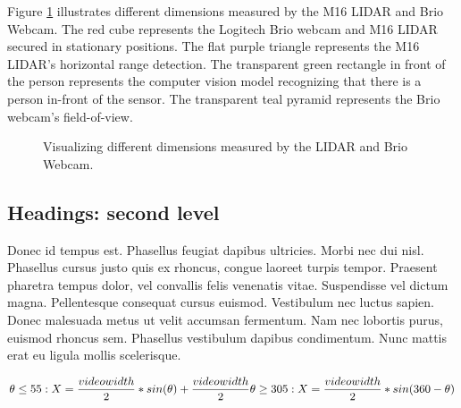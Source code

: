 \documentclass{article}
\begin{document}
		Figure \ref{fig:fig1}  illustrates different dimensions measured by the M16 LIDAR and Brio Webcam.
		The red cube represents the Logitech Brio webcam and M16 LIDAR secured in stationary positions.
		The flat purple triangle represents the M16 LIDAR's horizontal range detection.
		The transparent green rectangle in front of the person represents the computer vision model recognizing that there is a person in-front of the sensor.
    The transparent teal pyramid represents the Brio webcam's field-of-view.

    \begin{figure}
      \centering
      \caption{Visualizing different dimensions measured by the LIDAR and Brio Webcam.}
      \label{fig:fig1}
    \end{figure}



\subsection{Headings: second level}
Donec id tempus est. Phasellus feugiat dapibus ultricies. Morbi nec dui nisl. Phasellus cursus justo quis ex rhoncus, congue laoreet turpis tempor. Praesent pharetra tempus dolor, vel convallis felis venenatis vitae. Suspendisse vel dictum magna. Pellentesque consequat cursus euismod. Vestibulum nec luctus sapien. Donec malesuada metus ut velit accumsan fermentum. Nam nec lobortis purus, euismod rhoncus sem. Phasellus vestibulum dapibus condimentum. Nunc mattis erat eu ligula mollis scelerisque. 

\begin{equation} \label{eq1}
  \theta \leq  55:
  X = \frac{video width}{2} * sin(\theta) + \frac{video width}{2}\\
  \\
  \theta \geq 305:
  X = \frac{video width}{2} * sin(360 - \theta)\\
\end{equation}
  
\end{document}

